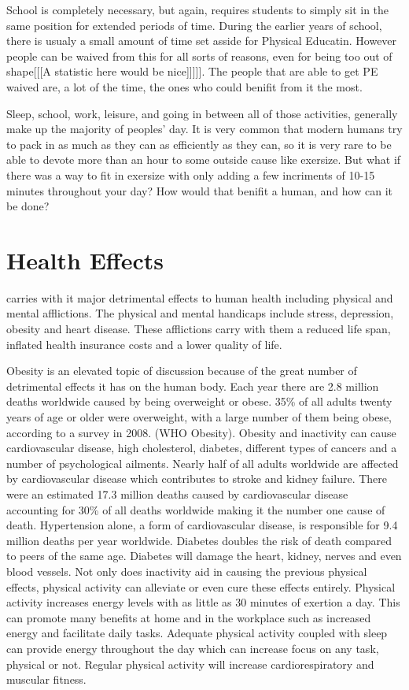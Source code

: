 \documentclass[12pt,article]{IEEEtran}
\begin{document}
School is completely necessary, but again, requires students to simply sit in the same position for extended periods of time. During the earlier years of school, there is usualy a small amount of time set asside for Physical Educatin. However people can be waived from this for all sorts of reasons, even for being too out of shape[[[A statistic here would be nice]]]]]. The people that are able to get PE waived are, a lot of the time, the ones who could benifit from it the most. 

Sleep, school, work, leisure, and going in between all of those activities, generally make up the majority of peoples’ day. It is very common that modern humans try to pack in as much as they can as efficiently as they can, so it is very rare to be able to devote more than an hour to some outside cause like exersize. But what if there was a way to fit in exersize with only adding a few incriments of 10-15 minutes throughout your day? How would that benifit a human, and how can it be done?

\section{Health Effects}
  carries with it major detrimental effects to human health including physical and mental afflictions.  The physical and mental handicaps include stress, depression, obesity and heart disease.  These afflictions carry with them a reduced life span, inflated health insurance costs and a lower quality of life.

Obesity is an elevated topic of discussion because of the great number of detrimental effects it has on the human body.  Each year there are 2.8 million deaths worldwide caused by being overweight or obese.  35\% of all adults twenty years of age or older were overweight, with a large number of them being obese, according to a survey in 2008. (WHO Obesity).  Obesity and inactivity can cause cardiovascular disease, high cholesterol, diabetes, different types of cancers and a number of psychological ailments.  Nearly half of all adults worldwide are affected by cardiovascular disease which  contributes to stroke and kidney failure.  There were an estimated 17.3 million deaths caused by cardiovascular disease accounting for 30\% of all deaths worldwide making it the number one cause of death.  Hypertension alone, a form of cardiovascular disease, is responsible for 9.4 million deaths per year worldwide.  Diabetes doubles the risk of death compared to peers of the same age.  Diabetes will damage the heart, kidney, nerves and even blood vessels.
Not only does inactivity aid in causing the previous physical effects, physical activity can alleviate or even cure these effects entirely. Physical activity increases energy levels with as little as 30 minutes of exertion a day.  This can promote many benefits at home and in the workplace such as increased energy and facilitate daily tasks.  Adequate physical activity coupled with sleep can provide energy throughout the day which can increase focus on any task, physical or not.  Regular physical activity will increase cardiorespiratory and muscular fitness.
\end{document}
